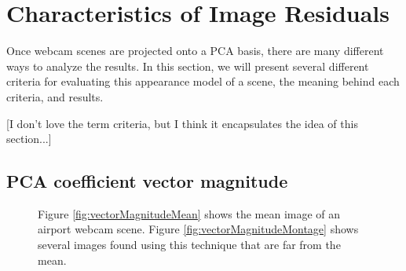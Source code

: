 \section{Characteristics of Image Residuals}

Once webcam scenes are projected onto a PCA basis, there are many different ways to analyze the results.  In this section, we will present several different criteria for evaluating this appearance model of a scene, the meaning behind each criteria, and results.

[I don't love the term criteria, but I think it encapsulates the idea of this section...]

\subsection{PCA coefficient vector magnitude}

\begin{figure}
	\centering
		\caption[Criteria: Gradient Magnitude.]{Figure \ref{fig:vectorMagnitudeMean} shows the mean image of an airport webcam scene. Figure \ref{fig:vectorMagnitudeMontage} shows several images found using this technique that are far from the mean.}
\end{figure}

